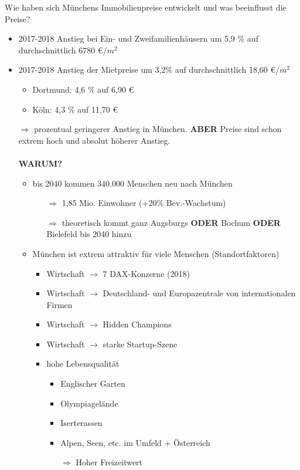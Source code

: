 \documentclass[12pt,a3paper]{report}
\begin{document}
	\noindent
	\huge Wie haben sich Münchens Immobilienpreise entwickelt und was beeinflusst die Preise?
	\Large
	\noindent
	\begin{itemize}
		\item 2017-2018 Anstieg bei Ein- und Zweifamilienhäusern um 5,9 \%  auf durchschnittlich 6780 \euro/$m^2$
		\item 2017-2018 Anstieg der Mietpreise um 3,2\% auf durchschnittlich 18,60 \euro/$m^2$
		\begin{itemize}
			\item Dortmund: 4,6 \% auf 6,90 \euro
			\item Köln: 4,3 \% auf 11,70 \euro
		\end{itemize}
		\item[$\Rightarrow$] prozentual geringerer Anstieg in München.
		\textbf{ABER} Preise sind schon extrem hoch und absolut höherer Anstieg. \\\\
		\color{red}\textbf{WARUM?}\color{black}
		\begin{itemize}
			\item bis 2040 kommen 340.000 Menschen neu nach München 
			\begin{itemize}
				\item[$\Rightarrow$] 1,85 Mio. Einwohner (+20\% Bev.-Wachstum)
				\item[$\Rightarrow$] theoretisch kommt ganz Augsburgs \textbf{ODER} Bochum \textbf{ODER} Bielefeld bis 2040 hinzu
			\end{itemize}
			\item München ist extrem attraktiv für viele Menschen (Standortfaktoren)
			\begin{itemize}
				\item Wirtschaft $\to$ 7 DAX-Konzerne (2018)
				\item Wirtschaft $\to$ Deutschland- und Europazentrale von internationalen Firmen
				\item Wirtschaft $\to$ Hidden Champions
				\item Wirtschaft $\to$ starke Startup-Szene
				\item hohe Lebensqualität
				\begin{itemize}
					\item Englischer Garten
					\item Olympiagelände
					\item Iserterassen
					\item Alpen, Seen, etc. im Umfeld + Österreich
					\item[$\Rightarrow$] Hoher Freizeitwert

\end{itemize}
\end{itemize}
\end{itemize}
\end{itemize}
\end{document}
